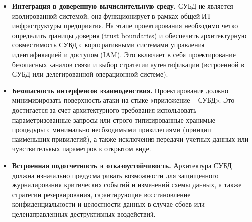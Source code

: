 \begin{itemize}
    \item \textbf{Интеграция в доверенную вычислительную среду.} 
    СУБД не является изолированной системой; она функционирует в рамках общей ИТ-инфраструктуры предприятия. На этапе проектирования необходимо четко определить границы доверия (trust boundaries) и обеспечить архитектурную совместимость СУБД с корпоративными системами управления идентификацией и доступом (IAM). Это включает в себя проектирование безопасных каналов связи и выбор стратегии аутентификации (встроенной в СУБД или делегированной операционной системе). \cite{nist800160}

    \item \textbf{Безопасность интерфейсов взаимодействия.} 
    Проектирование должно минимизировать поверхность атаки на стыке «приложение – СУБД». Это достигается за счет архитектурного требования использовать параметризованные запросы или строго типизированные хранимые процедуры с минимально необходимыми привилегиями (принцип наименьших привилегий), а также исключения передачи учетных данных или чувствительных параметров в открытом виде.

    \item \textbf{Встроенная подотчетность и отказоустойчивость.} 
    Архитектура СУБД должна изначально предусматривать возможности для защищенного журналирования критических событий и изменений схемы данных, а также стратегии резервирования, гарантирующие восстановление конфиденциальности и целостности данных в случае сбоев или целенаправленных деструктивных воздействий. \cite{nist80053}
\end{itemize}

